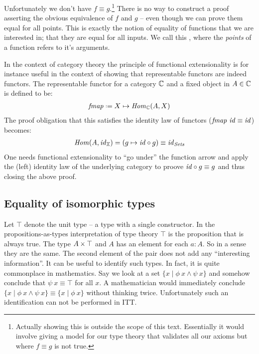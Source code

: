 Unfortunately we don't have $f \equiv g$.\footnote{Actually showing this is
outside the scope of this text. Essentially it would involve giving a model
for our type theory that validates all our axioms but where $f \equiv g$ is
not true.} There is no way to construct a proof asserting the obvious
equivalence of $f$ and $g$ -- even though we can prove them equal for all
points. This is exactly the notion of equality of functions that we are
interested in; that they are equal for all inputs. We call this
, where the \emph{points} of a function refers
to it's arguments.

In the context of category theory the principle of functional extensionality is
for instance useful in the context of showing that representable functors are
indeed functors. The representable functor for a category $\mathbb{C}$ and a fixed
object in $A \in \mathbb{C}$ is defined to be:
%
\begin{align*}
\fmap \defeq X \mapsto \Hom_{\bC}(A, X)
\end{align*}
%
The proof obligation that this satisfies the identity law of functors
($\mathit{fmap}\ \mathit{id} \equiv \mathit{id}$) becomes:
%
\begin{align*}
\mathit{Hom}(A, \mathit{id}_{\mathbb{X}}) = (g \mapsto \mathit{id} \circ g) \equiv \mathit{id}_{\mathit{Sets}}
\end{align*}
%
One needs functional extensionality to ``go under'' the function arrow and apply
the (left) identity law of the underlying category to proove $\mathit{id} \circ g
\equiv g$ and thus closing the above proof.
%
\iffalse
I also want to talk about:
\begin{itemize}
\item
  Foundational systems
\item
  Theory vs. metatheory
\item
  Internal type theory
\end{itemize}
\fi
\subsection{Equality of isomorphic types}
%
Let $\top$ denote the unit type -- a type with a single constructor. In the
propositions-as-types interpretation of type theory $\top$ is the proposition
that is always true. The type $A \times \top$ and $A$ has an element for each $a :
A$. So in a sense they are the same. The second element of the pair does not add
any ``interesting information''. It can be useful to identify such types. In
fact, it is quite commonplace in mathematics. Say we look at a set $\{x \mid
\phi\ x \land \psi\ x\}$ and somehow conclude that $\psi\ x \equiv \top$ for all
$x$. A mathematician would immediately conclude $\{x \mid \phi\ x \land
\psi\ x\} \equiv \{x \mid \phi\ x\}$ without thinking twice. Unfortunately such
an identification can not be performed in ITT.

